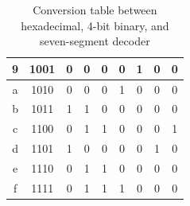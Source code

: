 \documentclass[12pt]{article}
\begin{document}
\begin{table}[ht]
\begin{tabular}{ | c | c | c | c | c | c | c | c | c | }
  9                                                                      & 1001                                                                    & 0                             & 0                             & 0                             & 0                             & 1                             & 0                             & 0                             \\ \hline \rule{0em}{1.15em}
  a                                                                      & 1010                                                                    & 0                             & 0                             & 0                             & 1                             & 0                             & 0                             & 0                             \\ \hline \rule{0em}{1.15em}
  b                                                                      & 1011                                                                    & 1                             & 1                             & 0                             & 0                             & 0                             & 0                             & 0                             \\ \hline \rule{0em}{1.15em}
  c                                                                      & 1100                                                                    & 0                             & 1                             & 1                             & 0                             & 0                             & 0                             & 1                             \\ \hline \rule{0em}{1.15em}
  d                                                                      & 1101                                                                    & 1                             & 0                             & 0                             & 0                             & 0                             & 1                             & 0                             \\ \hline \rule{0em}{1.15em}
  e                                                                      & 1110                                                                    & 0                             & 1                             & 1                             & 0                             & 0                             & 0                             & 0                             \\ \hline \rule{0em}{1.15em}
  f                                                                      & 1111                                                                    & 0                             & 1                             & 1                             & 1                             & 0                             & 0                             & 0                             \\ \hline
  \end{tabular}
  \caption{Conversion table between hexadecimal, 4-bit binary, and seven-segment decoder}
  \label{table:1}
\end{table}
\end{document}

